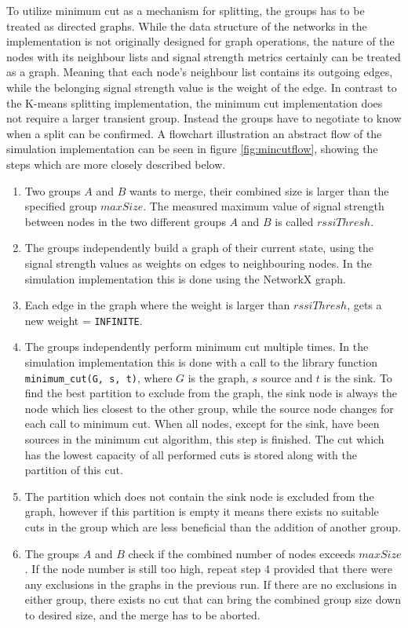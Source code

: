 To utilize minimum cut as a mechanism for splitting, the groups has to be treated as directed graphs. While the data structure of the networks in the implementation is not
originally designed for graph operations, the nature of the nodes with its neighbour lists and signal strength metrics certainly can be treated as a graph. Meaning that each node's neighbour list contains
its outgoing edges, while the belonging signal strength value is the weight of the edge. In contrast to the K-means splitting implementation, the minimum cut implementation does not require
a larger transient group. Instead the groups have to negotiate to know when a split can be confirmed. A flowchart illustration an abstract flow of the simulation implementation can be seen in figure \ref{fig:mincutflow}, showing the steps which are more closely described below. 

\begin{enumerate}
	\item Two groups $A$ and $B$ wants to merge, their combined size is larger than the specified group $maxSize$. The measured maximum value of signal strength between nodes in the two different
		groups $A$ and $B$ is called $rssiThresh$. 
	\item The groups independently build a graph of their current state, using the signal strength values as weights on edges to neighbouring nodes. In the simulation implementation this is done using the NetworkX graph.
	\item Each edge in the graph where the weight is larger than  $rssiThresh$, gets a new weight = \verb|INFINITE|.
	\item The groups independently perform minimum cut multiple times. In the simulation implementation this is done with a call to the library function \newline \verb|minimum_cut(G, s, t)|,
		where $G$ is the graph, $s$ source and $t$ is the sink. To find the best partition to exclude from the graph, the  sink node is always the node which lies closest to the other group,
		while the source node changes for each call to minimum cut. When all nodes, except for the sink, have been sources in the minimum cut algorithm, this step is finished. The cut
		which has the lowest capacity of all performed cuts is stored along with the partition of this cut. 
	\item The partition which does not contain the sink node is excluded from the graph, however if this partition is empty it means there exists no suitable cuts in the group which are less beneficial than the addition of another group. 
	\item The groups $A$ and $B$ check if the combined number of nodes exceeds $maxSize$. If the node number is still too high, repeat step 4 provided that there were any 
		exclusions in the graphs in the previous run. If there are no exclusions in either group, there exists no cut that can bring the combined group size down to desired size, and the
		merge has to be aborted. 
\end{enumerate}


